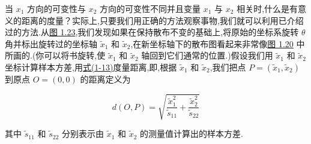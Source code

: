 当 $x_1$ 方向的可变性与 $x_2$ 方向的可变性不同并且变量 $x_1$ 与 $x_2$ 相关时,什么是有意义的距离的度量？实际上,只要我们用正确的方法观察事物,我们就可以利用已介绍过的方法.从\hyperref[fig:1.23]{图 1.23},我们发现如果在保持散布不变的基础上,将原始的坐标系旋转 $\theta$ 角并标出旋转过的坐标轴 $\tilde{x}_1$ 和 $\tilde{x}_2$,在新坐标轴下的散布图看起来非常像\hyperref[fig:1.20]{图 1.20} 中所画的.(你可以将书旋转,使 $\tilde{x}_1$ 和 $\tilde{x}_2$ 轴回到它们通常的位置.)假设我们用 $\tilde{x}_1$ 和 $\tilde{x}_2$ 坐标计算样本方差,用\hyperref[eq:1-13]{式(1-13)}度量距离,即,根据 $\tilde{x}_1$ 和 $\tilde{x}_2$,我们把点 $P = (\tilde{x}_1,\tilde{x}_2)$ 到原点 $O = (0,0)$ 的距离定义为

\label{eq:1-17}
\begin{equation}
d(O,P) = \sqrt{\frac{\tilde{x}_1^2}{\tilde{s}_{11}} + \frac{\tilde{x}_2^2}{\tilde{s}_{22}}} \tag{1-17}
\end{equation}

其中 $\tilde{s}_{11}$ 和 $\tilde{s}_{22}$ 分别表示由 $\tilde{x}_1$ 和 $\tilde{x}_2$ 的测量值计算出的样本方差.
